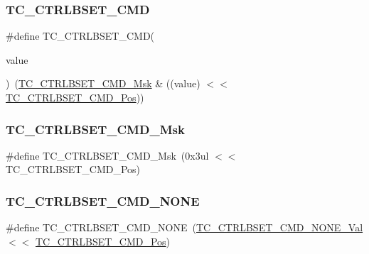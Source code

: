 \subsubsection{\texorpdfstring{TC\_CTRLBSET\_CMD}{TC\_CTRLBSET\_CMD}}
{\footnotesize\ttfamily \#define T\+C\+\_\+\+C\+T\+R\+L\+B\+S\+E\+T\+\_\+\+C\+MD(\begin{DoxyParamCaption}\item[{}]{value }\end{DoxyParamCaption})~(\mbox{\hyperlink{group___s_a_m_d21___t_c_ga6a550608ebf046c273f725f855c10ed4}{T\+C\+\_\+\+C\+T\+R\+L\+B\+S\+E\+T\+\_\+\+C\+M\+D\+\_\+\+Msk}} \& ((value) $<$$<$ \mbox{\hyperlink{group___s_a_m_d21___t_c_ga300926b23e1f7430a6e8a93d73fd98cc}{T\+C\+\_\+\+C\+T\+R\+L\+B\+S\+E\+T\+\_\+\+C\+M\+D\+\_\+\+Pos}}))}

\mbox{\label{group___s_a_m_d21___t_c_ga6a550608ebf046c273f725f855c10ed4}} 
\subsubsection{\texorpdfstring{TC\_CTRLBSET\_CMD\_Msk}{TC\_CTRLBSET\_CMD\_Msk}}
{\footnotesize\ttfamily \#define T\+C\+\_\+\+C\+T\+R\+L\+B\+S\+E\+T\+\_\+\+C\+M\+D\+\_\+\+Msk~(0x3ul $<$$<$ T\+C\+\_\+\+C\+T\+R\+L\+B\+S\+E\+T\+\_\+\+C\+M\+D\+\_\+\+Pos)}

\mbox{\label{group___s_a_m_d21___t_c_gab9e1c18dd358d27a2b0bf40e6a48f0e0}} 
\subsubsection{\texorpdfstring{TC\_CTRLBSET\_CMD\_NONE}{TC\_CTRLBSET\_CMD\_NONE}}
{\footnotesize\ttfamily \#define T\+C\+\_\+\+C\+T\+R\+L\+B\+S\+E\+T\+\_\+\+C\+M\+D\+\_\+\+N\+O\+NE~(\mbox{\hyperlink{group___s_a_m_d21___t_c_gaa843c0929ee48527e9f3f6ffb9e3246f}{T\+C\+\_\+\+C\+T\+R\+L\+B\+S\+E\+T\+\_\+\+C\+M\+D\+\_\+\+N\+O\+N\+E\+\_\+\+Val}}      $<$$<$ \mbox{\hyperlink{group___s_a_m_d21___t_c_ga300926b23e1f7430a6e8a93d73fd98cc}{T\+C\+\_\+\+C\+T\+R\+L\+B\+S\+E\+T\+\_\+\+C\+M\+D\+\_\+\+Pos}})}

